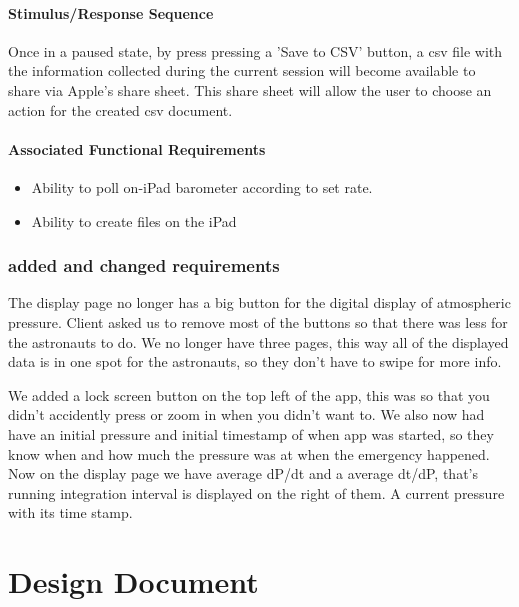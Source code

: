 \documentclass[onecolumn, draftclsnofoot,10pt, compsoc]{IEEEtran}
\begin{document}
\paragraph{Stimulus/Response Sequence}
Once in a paused state, by press pressing a 'Save to CSV' button, a csv file with the information collected during the current session will become available to share via Apple's share sheet.
This share sheet will allow the user to choose an action for the created csv document.
\paragraph{Associated Functional Requirements}
\begin{itemize}
\item Ability to poll on-iPad barometer according to set rate.
\item Ability to create files on the iPad
\end{itemize}


\subsubsection{added and changed requirements}
The display page no longer has a big button for the digital display of atmospheric pressure. 
Client asked us to remove most of the buttons so that there was less for the astronauts to do.
We no longer have three pages, this way all of the displayed data is in one spot for the astronauts, so they don't have to swipe for more info.  

We added a lock screen button on the top left of the app, this was so that you didn't accidently press or zoom in when you didn't want to.
We also now had have an initial pressure and initial timestamp of when app was started, so they know when and how much the pressure was at when the emergency happened. 
Now on the display page we have average dP/dt and a average dt/dP, that's running integration interval is displayed on the right of them.
A current pressure with its time stamp. 



\section{Design Document}
\end{document}
